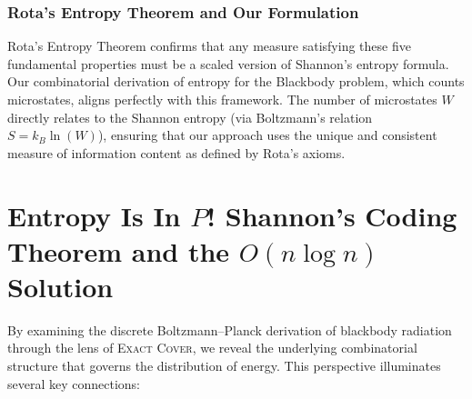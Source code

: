 \documentclass{report}
\begin{document}
\subsubsection*{Rota’s Entropy Theorem and Our Formulation}
Rota’s Entropy Theorem confirms that any measure satisfying these five fundamental properties must be a scaled version of Shannon's entropy formula. Our combinatorial derivation of entropy for the Blackbody problem, which counts microstates, aligns perfectly with this framework. The number of microstates \(W\) directly relates to the Shannon entropy (via Boltzmann’s relation \(S = k_B \ln(W)\)), ensuring that our approach uses the unique and consistent measure of information content as defined by Rota's axioms.

\section*{Entropy Is In $P$! Shannon's Coding Theorem and the $O(n \log n)$ Solution}


By examining the discrete Boltzmann--Planck derivation of blackbody radiation through the lens of \textsc{Exact Cover}, we reveal the underlying combinatorial structure that governs the distribution of energy. This perspective illuminates several key connections:
\end{document}
